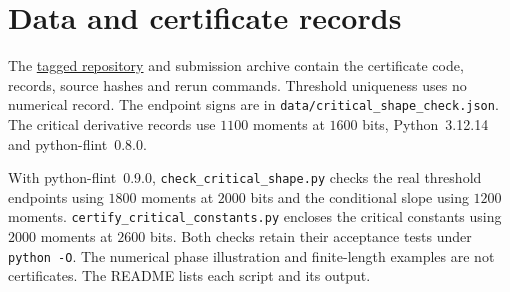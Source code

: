 \section{Data and certificate records}\label{app:data}

The \href{https://github.com/apemm/Kagey-Problems/tree/paperD-ejp-v6/kagey-problems/problem131/paperD}{tagged repository}
and submission archive contain the certificate code, records, source
hashes and rerun commands. Threshold uniqueness uses no numerical
record. The endpoint signs are in
\nolinkurl{data/critical_shape_check.json}. The critical derivative records
use $1100$ moments at $1600$ bits, Python~3.12.14 and
python-flint~0.8.0.

With python-flint~0.9.0, \nolinkurl{check_critical_shape.py} checks
the real threshold endpoints using $1800$ moments at $2000$ bits
and the conditional slope using $1200$ moments.
\nolinkurl{certify_critical_constants.py} encloses the critical
constants using $2000$ moments at $2600$ bits. Both checks retain
their acceptance tests under \texttt{python -O}. The numerical
phase illustration and finite-length examples are not certificates.
The README lists each script and its output.
